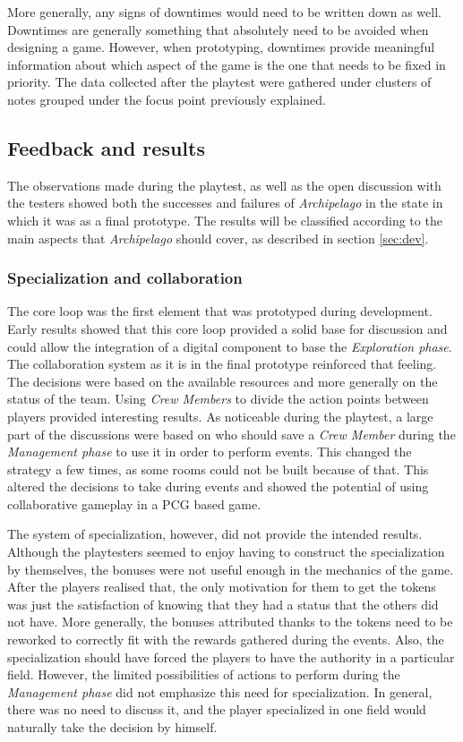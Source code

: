 More generally, any signs of downtimes would need to be written down as well. Downtimes are generally something that absolutely need to be avoided when designing a game. However, when prototyping, downtimes provide meaningful information about which aspect of the game is the one that needs to be fixed in priority. The data collected after the playtest were gathered under clusters of notes grouped under the focus point previously explained.
\subsection{Feedback and results}
The observations made during the playtest, as well as the open discussion with the testers showed both the successes and failures of \textit{Archipelago} in the state in which it was as a final prototype. The results will be classified according to the main aspects that \textit{Archipelago} should cover, as described in section \ref{sec:dev}.

\subsubsection{Specialization and collaboration}
The core loop was the first element that was prototyped during development. Early results showed that this core loop provided a solid base for discussion and could allow the integration of a digital component to base the \textit{Exploration phase}. The collaboration system as it is in the final prototype reinforced that feeling. The decisions were based on the available resources and more generally on the status of the team. Using \textit{Crew Members} to divide the action points between players provided interesting results. As noticeable during the playtest, a large part of the discussions were based on who should save a \textit{Crew Member} during the \textit{Management phase} to use it in order to perform events. This changed the strategy a few times, as some rooms could not be built because of that. This altered the decisions to take during events and showed the potential of using collaborative gameplay in a PCG based game.

The system of specialization, however, did not provide the intended results. Although the playtesters seemed to enjoy having to construct the specialization by themselves, the bonuses were not useful enough in the mechanics of the game. After the players realised that, the only motivation for them to get the tokens was just the satisfaction of knowing that they had a status that the others did not have. More generally, the bonuses attributed thanks to the tokens need to be reworked to correctly fit with the rewards gathered during the events. Also, the specialization should have forced the players to have the authority in a particular field. However, the limited possibilities of actions to perform during the \textit{Management phase} did not emphasize this need for specialization. In general, there was no need to discuss it, and the player specialized in one field would naturally take the decision by himself.

